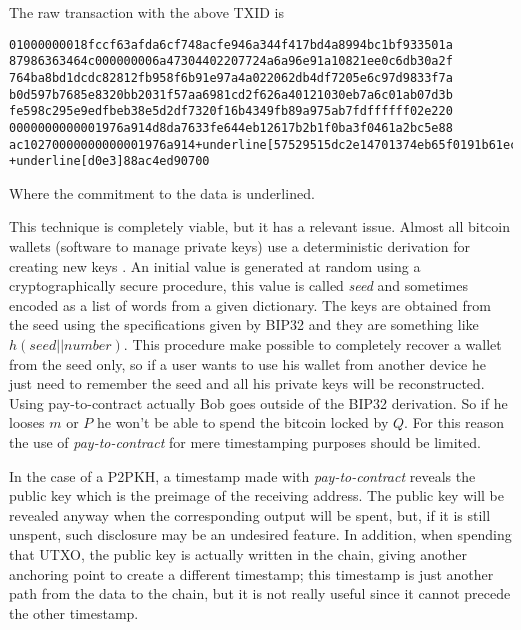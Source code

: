 The raw transaction with the above TXID is 
\begin{Verbatim}[commandchars=+\[\], frame=single]
01000000018fccf63afda6cf748acfe946a344f417bd4a8994bc1bf933501a
87986363464c000000006a47304402207724a6a96e91a10821ee0c6db30a2f
764ba8bd1dcdc82812fb958f6b91e97a4a022062db4df7205e6c97d9833f7a
b0d597b7685e8320bb2031f57aa6981cd2f626a40121030eb7a6c01ab07d3b
fe598c295e9edfbeb38e5d2df7320f16b4349fb89a975ab7fdffffff02e220
0000000000001976a914d8da7633fe644eb12617b2b1f0ba3f0461a2bc5e88
ac10270000000000001976a914+underline[57529515dc2e14701374eb65f0191b61ecfd]
+underline[d0e3]88ac4ed90700
\end{Verbatim}
Where the commitment to the data is underlined.

This technique is completely viable, but it has a relevant issue.
Almost all bitcoin wallets (software to manage private keys) use a deterministic derivation for creating new keys \cite{BIP32}. An initial value is generated at random using a cryptographically secure procedure, this value is called \textit{seed} and sometimes encoded as a list of words from a given dictionary. The keys are obtained from the seed using the specifications given by BIP32 and they are something like $h(seed||number)$. This procedure make possible to completely recover a wallet from the seed only, so if a user wants to use his wallet from another device he just need to remember the seed and all his private keys will be reconstructed.
Using pay-to-contract actually Bob goes outside of the BIP32 derivation. So if he looses $m$ or $P$ he won't be able to spend the bitcoin locked by $Q$. For this reason the use of \textit{pay-to-contract} for mere timestamping purposes should be limited.

In the case of a P2PKH, a timestamp made with \textit{pay-to-contract} reveals the public key which is the preimage of the receiving address. 
The public key will be revealed anyway when the corresponding output will be spent, but, if it is still unspent, such disclosure may be an undesired feature. 
In addition, when spending that UTXO, the public key is actually written in the chain, giving another anchoring point to create a different timestamp; this timestamp is just another path from the data to the chain, but it is not really useful since it cannot precede the other timestamp.


